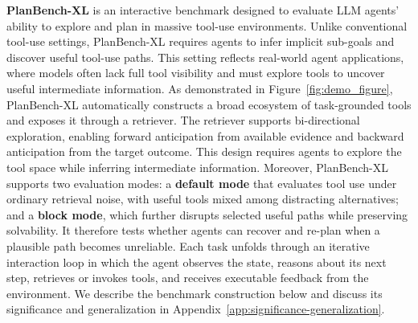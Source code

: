\documentclass{llmxive}
\providecommand{\BENCH}[1]{\textbf{PlanBench-XL}}
\providecommand{\bench}[1]{PlanBench-XL}
\begin{document}
\BENCH{} is an interactive benchmark designed to evaluate LLM agents’ ability to explore and plan in massive tool-use environments.
Unlike conventional tool-use settings, \bench{} requires agents to infer implicit sub-goals and discover useful tool-use paths.
This setting reflects real-world agent applications, where models often lack full tool visibility and must explore tools to uncover useful intermediate information.
As demonstrated in Figure~\ref{fig:demo_figure}, \bench{} automatically constructs a broad ecosystem of task-grounded tools and exposes it through a retriever.
The retriever supports bi-directional exploration, enabling forward anticipation from available evidence and backward anticipation from the target outcome.
This design requires agents to explore the tool space while inferring intermediate information.
Moreover, \bench{} supports two evaluation modes: a \textbf{default mode} that evaluates tool use under ordinary retrieval noise, with useful tools mixed among distracting alternatives; and a \textbf{block mode}, which further disrupts selected useful paths while preserving solvability.
It therefore tests whether agents can recover and re-plan when a plausible path becomes unreliable.
Each task unfolds through an iterative interaction loop in which the agent observes the state, reasons about its next step, retrieves or invokes tools, and receives executable feedback from the environment. 
We describe the benchmark construction below and discuss its significance and generalization in Appendix~\ref{app:significance-generalization}.



\end{document}
